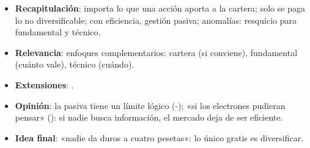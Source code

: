 \documentclass{article}
\begin{document}
\begin{columnas}
\begin{itemize}
\item \textbf{Recapitulación}: importa lo que una acción aporta a la cartera; solo se paga lo no diversificable; con eficiencia, gestión pasiva; anomalías: resquicio para fundamental y técnico.
\item \textbf{Relevancia}: enfoques complementarios: cartera (si conviene), fundamental (cuánto vale), técnico (cuándo).
\item \textbf{Extensiones}:     .
\item \textbf{Opinión}: la pasiva tiene un límite lógico (-); «si los electrones pudieran pensar» (): si nadie busca información, el mercado deja de ser eficiente.
\item \textbf{Idea final}: «nadie da duros a cuatro pesetas»: lo único gratis es diversificar.
\end{itemize}


\end{columnas}
\end{document}
